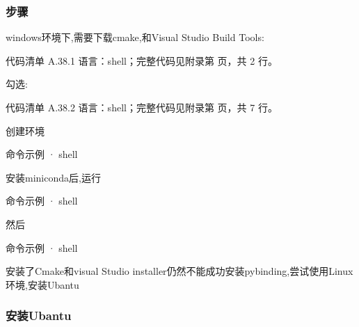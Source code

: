 \documentclass[lang=cn,scheme=chinese,color=blue,device=normal,toc=onecol,math=cm]{elegantbook}
\begin{document}
\subsubsection{步骤}


windows环境下,需要下载cmake,和Visual Studio Build Tools:\par


\begin{codeindexbox}{代码清单 A.38.1}
语言：shell；完整代码见附录第 \pageref{code:38:1} 页，共 2 行。
\end{codeindexbox}


勾选:\par


\begin{codeindexbox}{代码清单 A.38.2}
语言：shell；完整代码见附录第 \pageref{code:38:2} 页，共 7 行。
\end{codeindexbox}


创建环境\par


\begin{inlinecodebox}{命令示例 · shell}
\end{inlinecodebox}


安装miniconda后,运行\par


\begin{inlinecodebox}{命令示例 · shell}
\end{inlinecodebox}


然后\par


\begin{inlinecodebox}{命令示例 · shell}
\end{inlinecodebox}


安装了Cmake和visual Studio installer仍然不能成功安装pybinding,尝试使用Linux环境,安装Ubantu\par


\subsubsection{安装Ubantu}
\end{document}
